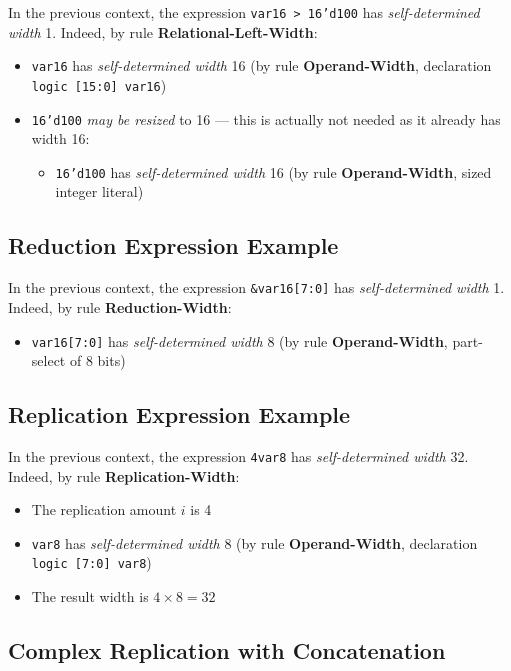 \documentclass{article}
\newcommand{\sv}[1]{\texttt{#1}}
\newcommand{\sds}{\emph{self-determined width}}
\newcommand{\mbr}{\emph{may be resized}}
\begin{document}
In the previous context, the expression \sv{var16 > 16'd100} has
\sds{} 1. Indeed, by rule \textbf{Relational-Left-Width}:

\begin{itemize}
  \item \sv{var16} has \sds{} 16 (by rule
    \textbf{Operand-Width}, declaration \sv{logic [15:0] var16})
  \item \sv{16'd100} \mbr{} to 16 --- this is actually not
    needed as it already has width 16:
    \begin{itemize}
      \item \sv{16'd100} has \sds{} 16 (by rule
        \textbf{Operand-Width}, sized integer literal)
    \end{itemize}
\end{itemize}

\subsection{Reduction Expression Example}

In the previous context, the expression \sv{&var16[7:0]} has
\sds{} 1. Indeed, by rule \textbf{Reduction-Width}:

\begin{itemize}
  \item \sv{var16[7:0]} has \sds{} 8 (by rule
    \textbf{Operand-Width}, part-select of 8 bits)
\end{itemize}

\subsection{Replication Expression Example}

In the previous context, the expression \sv{{4{var8}}} has
\sds{} 32. Indeed, by rule \textbf{Replication-Width}:

\begin{itemize}
  \item The replication amount $i$ is 4
  \item \sv{var8} has \sds{} 8 (by rule
    \textbf{Operand-Width}, declaration \sv{logic [7:0] var8})
  \item The result width is $4 \times 8 = 32$
\end{itemize}

\subsection{Complex Replication with Concatenation}
\end{document}
